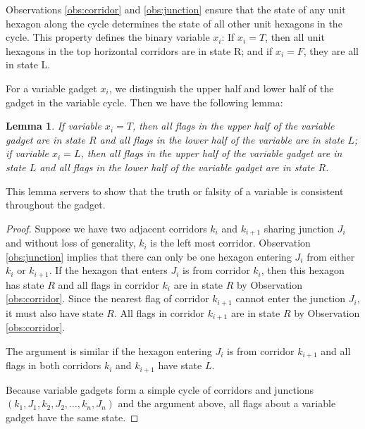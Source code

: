 \documentclass[10pt]{CSUNthesis}
\theoremstyle{plain}%
\newtheorem{lem}{Lemma}
\theoremstyle{definition}
\theoremstyle{remark}
\newcommand{\lr}[1]{\left( #1 \right)}
\begin{document}
Observations \ref{obs:corridor} and \ref{obs:junction} ensure that the state of any unit hexagon along the cycle determines the state of all other unit hexagons in the cycle. 
This property defines the binary variable $x_i$: If $x_i=T$, then all unit hexagons in the top horizontal corridors are in state R; and if $x_i=F$, they are all in state L.

For a variable gadget $x_i$, we distinguish the upper half and lower half of the gadget in the variable cycle.
Then we have the following lemma:
\begin{lem}\label{lem:aux-2}
If variable $x_i = T$, then all flags in the upper half of the variable gadget are in state $R$ and all flags in the lower half of the variable are in state $L$; if variable $x_i = L$, then all flags in the upper half of the variable gadget are in state $L$ and all flags in the lower half of the variable gadget are in state $R$.    
\end{lem}
This lemma servers to show that the truth or falsity of a variable is consistent throughout the gadget.
\begin{proof}
Suppose we have two adjacent corridors $k_i$ and $k_{i+1}$ sharing junction $J_i$ and without loss of generality, $k_i$ is the left most corridor.
Observation \ref{obs:junction} implies that there can only be one hexagon entering $J_i$ from either $k_i$ or $k_{i+1}$. If the hexagon that enters $J_i$ is from corridor $k_i$, then this hexagon has state $R$ and all flags in corridor $k_i$ are in state $R$ by Observation \ref{obs:corridor}. 
Since the nearest flag of corridor $k_{i+1}$ cannot enter the junction $J_i$, it must also have state $R$.  
All flags in corridor $k_{i+1}$ are in state $R$ by Observation \ref{obs:corridor}. 

The argument is similar if the hexagon entering $J_i$ is from corridor $k_{i+1}$ and all flags in both corridors $k_i$ and $k_{i+1}$ have state $L$.

Because variable gadgets form a simple cycle of corridors and junctions $\lr{k_1, J_1, k_2, J_2, \dots, k_n, J_n}$ and the argument above, all flags about a variable gadget have the same state.
\end{proof}
\end{document}
